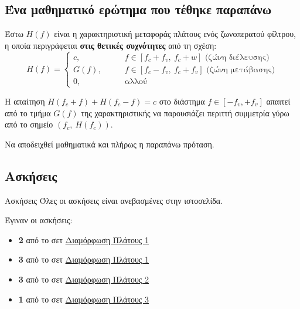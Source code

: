 \documentclass[11pt,a4paper,notitlepage,fleqn,final]{article}
\begin{document}

\subsection{Ένα μαθηματικό ερώτημα που τέθηκε παραπάνω}
\label{sec:interesting-question}
\begin{infobox}{}
	Έστω \( H(f) \) είναι η χαρακτηριστική μεταφοράς πλάτους ενός ζωνοπερατού φίλτρου,
	η οποία περιγράφεται \textbf{στις θετικές συχνότητες} από τη σχέση:
	\[
	H(f) = \begin{cases}
	c, \qquad & f \in \left[ f_c+f_v,\ f_c+w \right]\text{ (ζώνη διέλευσης)} \\
	G(f),\qquad & f\in \left[f_c-f_v,\ f_c+f_v\right]\text{ (ζώνη μετάβασης)} \\
	0,\qquad & \text{αλλού}
	\end{cases}
	\]
	
	Η απαίτηση \( H(f_c+f) + H(f_c-f) = c \) στο διάστημα \( f \in [-f_v,+f_v] \) απαιτεί από
	το τμήμα \( G(f) \) της χαρακτηριστικής να παρουσιάζει περιττή συμμετρία γύρω από το
	σημείο \( \left(f_c,\ H(f_c)\right) \).
	
	Να αποδειχθεί μαθηματικά και πλήρως η παραπάνω πρόταση.
\end{infobox}

\subsection{Ασκήσεις}
\begin{attnbox}{Ασκήσεις}
	Όλες οι ασκήσεις είναι ανεβασμένες στην ιστοσελίδα.
\end{attnbox}

Έγιναν οι ασκήσεις:
\begin{itemize}
	\item \textbf{2} από το σετ
	\href{https://genesis.ee.auth.gr/dimakis/greek/courses/telesysI/exers/am.pdf}{Διαμόρφωση Πλάτους 1}
	\item \textbf{3} από το σετ
	\href{https://genesis.ee.auth.gr/dimakis/greek/courses/telesysI/exers/am.pdf}{Διαμόρφωση Πλάτους 1}
	
	\item\textbf{3} από το σετ
	\href{https://genesis.ee.auth.gr/dimakis/greek/courses/telesysI/exers/ssb.pdf}{Διαμόρφωση Πλάτους 2}
	
	\item\textbf{1} από το σετ
	\href{https://genesis.ee.auth.gr/dimakis/greek/courses/telesysI/exers/vsb.pdf}{Διαμόρφωση Πλάτους 3}
\end{itemize}
\end{document}
